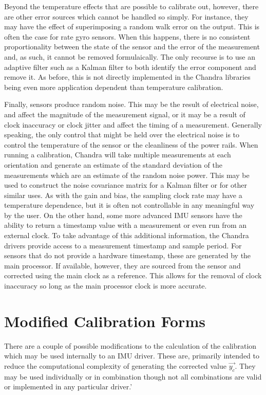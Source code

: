 \documentclass[10pt,letterpaper]{memoir} %
\begin{document}
Beyond the temperature effects that are possible to calibrate out, however, there are other error sources which cannot be handled so simply.  For instance, they may have the effect of superimposing a random walk error on the output.  This is often the case for rate gyro sensors.  When this happens, there is no consistent proportionality between the state of the sensor and the error of the measurement and, as such, it cannot be removed formulaically.  The only recourse is to use an adaptive filter such as a Kalman filter to both identify the error component and remove it.  As before, this is not directly implemented in the Chandra libraries being even more application dependent than temperature calibration.

Finally, sensors produce random noise.  This may be the result of electrical noise, and affect the magnitude of the measurement signal, or it may be a result of clock inaccuracy or clock jitter and affect the timing of a measurement.  Generally speaking, the only control that might be held over the electrical noise is to control the temperature of the sensor or the cleanliness of the power rails.  When running a calibration, Chandra will take multiple measurements at each orientation and generate an estimate of the standard deviation of the measurements which are an estimate of the random noise power.  This may be used to construct the noise covariance matrix for a Kalman filter or for other similar uses.  As with the gain and bias, the sampling clock rate may have a temperature dependence, but it is often not controllable in any meaningful way by the user.  On the other hand, some more advanced IMU sensors have the ability to return a timestamp value with a measurement or even run from an external clock.  To take advantage of this additional information, the Chandra drivers provide access to a measurement timestamp and sample period.  For sensors that do not provide a hardware timestamp, these are generated by the main processor.  If available, however, they are sourced from the sensor and corrected using the main clock as a reference.  This allows for the removal of clock inaccuracy so long as the main processor clock is more accurate.


\section{Modified Calibration Forms}
There are a couple of possible modifications to the calculation of the calibration which may be used internally to an IMU driver.  These are, primarily intended to reduce the computational complexity of generating the corrected value $\vec{y_c}$.  They may be used individually or in combination though not all combinations are valid or implemented in any particular driver.'
\end{document}
